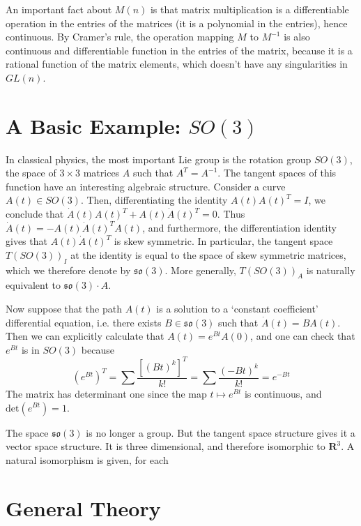 An important fact about $M(n)$ is that matrix multiplication is a differentiable operation in the entries of the matrices (it is a polynomial in the entries), hence continuous. By Cramer's rule, the operation mapping $M$ to $M^{-1}$ is also continuous and differentiable function in the entries of the matrix, because it is a rational function of the matrix elements, which doesn't have any singularities in $GL(n)$.

\section{A Basic Example: $SO(3)$}

In classical physics, the most important Lie group is the rotation group $SO(3)$, the space of $3 \times 3$ matrices $A$ such that $A^T = A^{-1}$. The tangent spaces of this function have an interesting algebraic structure. Consider a curve $A(t) \in SO(3)$. Then, differentiating the identity $A(t) A(t)^T = I$, we conclude that $\dot{A}(t) A(t)^T + A(t) \dot{A}(t)^T = 0$. Thus $\dot{A}(t) = - A(t) \dot{A}(t)^T A(t)$, and furthermore, the differentiation identity gives that $A(t) \dot{A}(t)^T$ is skew symmetric. In particular, the tangent space $T(SO(3))_I$ at the identity is equal to the space of skew symmetric matrices, which we therefore denote by $\mathfrak{so}(3)$. More generally, $T(SO(3))_A$ is naturally equivalent to $\mathfrak{so}(3) \cdot A$.

Now suppose that the path $A(t)$ is a solution to a `constant coefficient' differential equation, i.e. there exists $B \in \mathfrak{so}(3)$ such that $\dot{A}(t) = B A(t)$. Then we can explicitly calculate that $A(t) = e^{Bt} A(0)$, and one can check that $e^{Bt}$ is in $SO(3)$ because
%
\[ (e^{Bt})^T = \sum \frac{[(Bt)^k]^T}{k!} = \sum \frac{(-Bt)^k}{k!} = e^{-Bt} \]
%
The matrix has determinant one since the map $t \mapsto e^{Bt}$ is continuous, and $\text{det}(e^{Bt}) = 1$.

The space $\mathfrak{so}(3)$ is no longer a group. But the tangent space structure gives it a vector space structure. It is three dimensional, and therefore isomorphic to $\mathbf{R}^3$. A natural isomorphism is given, for each 

\section{General Theory}

